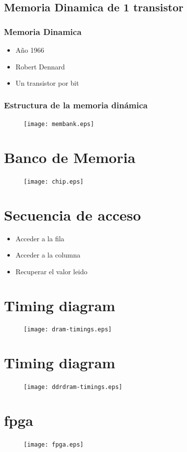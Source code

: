 \documentclass{beamer}
\begin{document}
\subsection{Memoria Dinamica de 1 transistor}
\begin{frame}
\frametitle{Memoria Dinamica}
\begin{itemize}
	\item Año 1966
	\item Robert Dennard
	\item Un transistor por bit
\end{itemize}
\end{frame}


\begin{frame}
\frametitle{Estructura de la  memoria dinámica}
\begin{figure}[!htb]
\centering
\texttt{[image: membank.eps]}
\end{figure}
\end{frame}

\section{Banco de Memoria}
\begin{frame}
\begin{figure}[!htb]
\centering
\texttt{[image: chip.eps]}
\end{figure}
\end{frame}

\section{Secuencia de acceso}
\begin{frame}
	\begin{itemize}
		\item Acceder a la fila
		\item Acceder a la columna
		\item Recuperar el valor leido
	\end{itemize}
\end{frame}

\section{Timing diagram}
\begin{frame}
\begin{figure}[!htb]
\centering
\texttt{[image: dram-timings.eps]}
\end{figure}
\end{frame}

\section{Timing diagram}
\begin{frame}
\begin{figure}[!htb]
\centering
\texttt{[image: ddrdram-timings.eps]}
\end{figure}
\end{frame}

\section{fpga}
\begin{frame}
\begin{figure}[!htb]
\centering
\texttt{[image: fpga.eps]}
\end{figure}
\end{frame}
\end{document}
